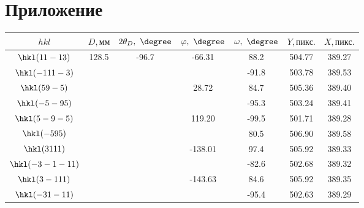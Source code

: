 \section*{Приложение}
\begin{table}[ht!]
    \centering
    \begin{tabular}{ |c|c|c|c|c|c|c| }
        \hline
                    $hkl$ &           $D,\unit{мм}$ &  $2\theta_D, \ \degree$ &     $\varphi, \ \degree$ & $\omega, \ \degree$ &    $Y,\unit{пикс.}$ &    $X,\unit{пикс.}$ \\
        \hline
        $  \hkl(11 -1 3)$ & \multirow{20}{*}{128.5} & \multirow{10}{*}{-96.7} &  \multirow{2}{*}{-66.31} &                88.2 &              504.77 &              389.27 \\
        $ \hkl(-11 1 -3)$ &                         &                         &                          &               -91.8 &              503.78 &              389.53 \\
        $   \hkl(5 9 -5)$ &                         &                         &   \multirow{2}{*}{28.72} &                84.7 &              505.36 &              389.40 \\
        $  \hkl(-5 -9 5)$ &                         &                         &                          &               -95.3 &              503.24 &              389.41 \\
        $  \hkl(5 -9 -5)$ &                         &                         &  \multirow{2}{*}{119.20} &               -99.5 &              501.71 &              389.28 \\
        $   \hkl(-5 9 5)$ &                         &                         &                          &                80.5 &              506.90 &              389.58 \\
        $   \hkl(3 1 11)$ &                         &                         & \multirow{2}{*}{-138.01} &                97.4 &              505.92 &              389.33 \\
        $\hkl(-3 -1 -11)$ &                         &                         &                          &               -82.6 &              502.68 &              389.32 \\
        $  \hkl(3 -1 11)$ &                         &                         & \multirow{2}{*}{-143.63} &                84.6 &              505.92 &              389.35 \\
        $ \hkl(-3 1 -11)$ &                         &                         &                          &               -95.4 &              502.63 &              389.29 \\

\end{tabular}
\end{table}
